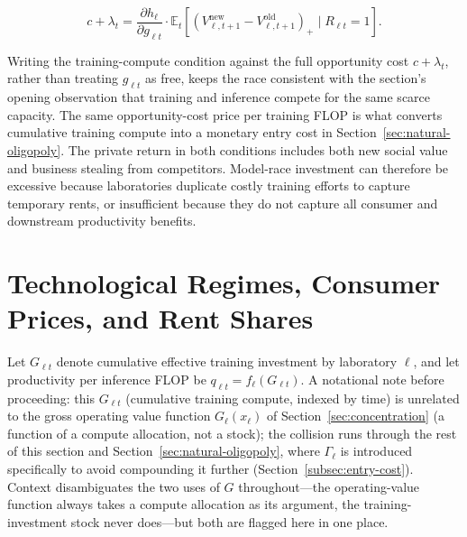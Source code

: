 \documentclass[11pt]{article}
\begin{document}
\begin{equation}c+\lambda_t=\frac{\partial h_\ell}{\partial g_{\ell t}}\cdot\mathbb E_t\left[\left(V_{\ell,t+1}^{\mathrm{new}}-V_{\ell,t+1}^{\mathrm{old}}\right)_+\mid R_{\ell t}=1\right].\end{equation}

Writing the training-compute condition against the full opportunity cost $c+\lambda_t$, rather than treating $g_{\ell t}$ as free, keeps the race consistent with the section's opening observation that training and inference compete for the same scarce capacity. The same opportunity-cost price per training FLOP is what converts cumulative training compute into a monetary entry cost in Section~\ref{sec:natural-oligopoly}. The private return in both conditions includes both new social value and business stealing from competitors. Model-race investment can therefore be excessive because laboratories duplicate costly training efforts to capture temporary rents, or insufficient because they do not capture all consumer and downstream productivity benefits.

\section{Technological Regimes, Consumer Prices, and Rent Shares}
\label{sec:technology-regimes}

Let $G_{\ell t}$ denote cumulative effective training investment by laboratory $\ell$, and let productivity per inference FLOP be $q_{\ell t}=f_\ell(G_{\ell t})$. A notational note before proceeding: this $G_{\ell t}$ (cumulative training compute, indexed by time) is unrelated to the gross operating value function $G_\ell(x_\ell)$ of Section~\ref{sec:concentration} (a function of a compute allocation, not a stock); the collision runs through the rest of this section and Section~\ref{sec:natural-oligopoly}, where $\Gamma_\ell$ is introduced specifically to avoid compounding it further (Section~\ref{subsec:entry-cost}). Context disambiguates the two uses of $G$ throughout---the operating-value function always takes a compute allocation as its argument, the training-investment stock never does---but both are flagged here in one place.
\end{document}
